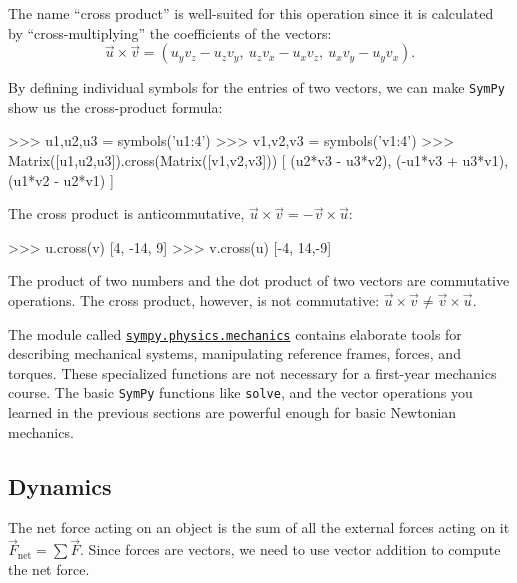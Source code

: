 \noindent
The name ``cross product'' is well-suited for this operation
since it is calculated by ``cross-multiplying'' the coefficients of the vectors:
\[
   \vec{u}\times\vec{v}=
   \left( 
     u_yv_z-u_zv_y, \ u_zv_x-u_xv_z, \ u_xv_y-u_yv_x 
    \right).
\]

\noindent
By defining individual symbols for the entries of two vectors,
we can make \texttt{SymPy} show us the cross-product formula:
\small
\begin{verbatimtab}
>>> u1,u2,u3 = symbols('u1:4')
>>> v1,v2,v3 = symbols('v1:4')
>>> Matrix([u1,u2,u3]).cross(Matrix([v1,v2,v3]))
[ (u2*v3 - u3*v2), (-u1*v3 + u3*v1), (u1*v2 - u2*v1) ]
\end{verbatimtab}
\normalsize

\noindent
The cross product is anticommutative, $\vec{u}\times\vec{v} = -\vec{v}\times\vec{u}$:
\small
\begin{verbatimtab}
>>> u.cross(v)
[4, -14, 9]
>>> v.cross(u)
[-4, 14,-9]
\end{verbatimtab}
\normalsize

\noindent
The product of two numbers and the dot product of two vectors are commutative operations.					
The cross product, however, is not commutative: $\vec{u}\times\vec{v} \neq \vec{v}\times\vec{u}$.




\label{sec:sympytut_mechanics}

The module called \href{http://pyvideo.org/video/2653/dynamics-and-control-with-python}{\texttt{sympy.physics.mechanics}} 
contains elaborate tools for describing mechanical systems,
manipulating reference frames, forces, and torques.
These specialized functions are not necessary for a first-year mechanics course.
The basic \texttt{SymPy} functions like \texttt{solve},
and the vector operations you learned in the previous sections are powerful enough for basic Newtonian mechanics.

\subsection{Dynamics}
\label{mechanics:dynamics}

The net force acting on an object is the sum of all the external forces acting on it $\vec{F}_{\textrm{net}} = \sum \vec{F}$.
Since forces are vectors,																		
we need to use vector addition to compute the net force.

